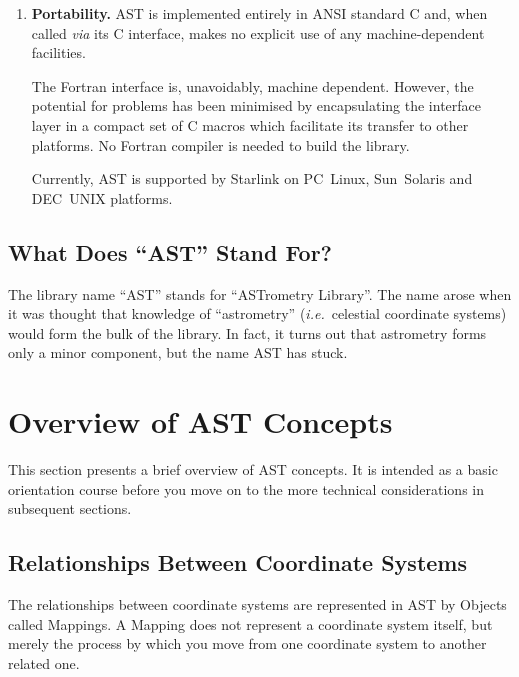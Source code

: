 \documentclass[twoside,11pt]{article}
\newcommand{\htmlref}[2]{#1}
\begin{document}
\begin{enumerate}
\item {\bf{Portability.}}
AST is implemented entirely in ANSI standard C and, when called
{\em{via}} its C interface, makes no explicit use of any
machine-dependent facilities.

The Fortran interface is, unavoidably, machine dependent. However, the
potential for problems has been minimised by encapsulating the
interface layer in a compact set of C macros which facilitate its
transfer to other platforms. No Fortran compiler is needed to build
the library.

Currently, AST is supported by Starlink on PC~Linux, Sun~Solaris and
DEC~UNIX platforms.
\end{enumerate}

\subsection{What Does ``AST'' Stand For?}

The library name ``AST'' stands for ``ASTrometry Library''. The name
arose when it was thought that knowledge of ``astrometry''
({\em{i.e.}}\ celestial coordinate systems) would form the bulk of the
library.  In fact, it turns out that astrometry forms only a minor
component, but the name AST has stuck.

\cleardoublepage
%
\section{Overview of AST Concepts}

This section presents a brief overview of AST concepts. It is intended
as a basic orientation course before you move on to the more technical
considerations in subsequent sections.

\subsection{\label{ss:mappingoverview}Relationships Between Coordinate Systems}

The relationships between coordinate systems are represented in AST by
Objects called Mappings. A \htmlref{Mapping}{Mapping} does not represent a coordinate
system itself, but merely the process by which you move from one
coordinate system to another related one.
 
\end{document}
